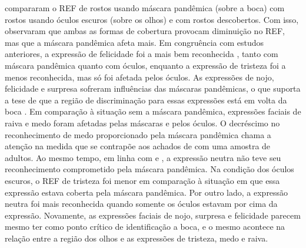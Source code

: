 \documentclass[portuguese]{textolivre}
\begin{document}
\textcite{noyes_effect_2021} compararam o REF de rostos usando máscara pandêmica (sobre a boca) com rostos usando óculos escuros (sobre os olhos) e com rostos descobertos. Com isso, observaram que ambas as formas de cobertura provocam diminuição no REF, mas que a máscara pandêmica afeta mais. Em congruência com estudos anteriores, a expressão de felicidade foi a mais bem reconhecida \cite{bani_behind_2021, carbon_wearing_2020}, tanto com máscara pandêmica quanto com óculos, enquanto a expressão de tristeza foi a menos reconhecida, mas só foi afetada pelos óculos. As expressões de nojo, felicidade e surpresa sofreram influências das máscaras pandêmicas, o que suporta a tese de que a região de discriminação para essas expressões está em volta da boca \cite{calvo_facial_2014, marini_impact_2021, wegrzyn_mapping_2017}.  Em comparação à situação sem a máscara pandêmica, expressões faciais de raiva e medo foram afetadas pelas máscaras e pelos óculos. O decréscimo no reconhecimento de medo proporcionado pela máscara pandêmica chama a atenção na medida que se contrapõe aos achados de \textcite{carbon_wearing_2020} com uma amostra de adultos. Ao mesmo tempo, em linha com \textcite{carbon_wearing_2020} e \textcite{marini_impact_2021}, a expressão neutra não teve seu reconhecimento comprometido pela máscara pandêmica. Na condição dos óculos escuros, o REF de tristeza foi menor em comparação à situação em que essa expressão estava coberta pela máscara pandêmica. Por outro lado, a expressão neutra foi mais reconhecida quando somente os óculos estavam por cima da expressão. Novamente, as expressões faciais de nojo, surpresa e felicidade parecem mesmo ter como ponto crítico de identificação a boca, e o mesmo acontece na relação entre a região dos olhos e as expressões de tristeza, medo e raiva.
\end{document}
